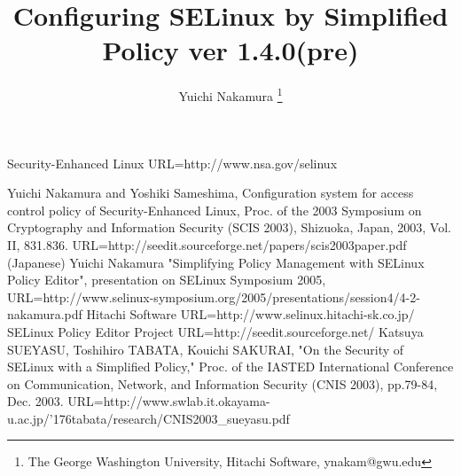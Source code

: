 \documentclass{article}
\title{Configuring SELinux by Simplified Policy ver 1.4.0(pre)}
\author{Yuichi Nakamura \thanks{The George Washington University, Hitachi Software, ynakam@gwu.edu}}
\begin{document}
\maketitle
\tableofcontents
\newpage







\begin{thebibliography}{99}
 Security-Enhanced Linux URL=http://www.nsa.gov/selinux

 Yuichi Nakamura and Yoshiki Sameshima,
	Configuration system 
for access control policy of Security-Enhanced Linux,
Proc. of the 2003 Symposium on Cryptography and
Information Security (SCIS 2003), Shizuoka, Japan,
2003, Vol. II,
	831.836.
	URL=http://seedit.sourceforge.net/papers/scis2003paper.pdf (Japanese)
 Yuichi Nakamura "Simplifying Policy Management
	with SELinux Policy Editor", presentation on SELinux Symposium
	2005,
	URL=http://www.selinux-symposium.org/2005/presentations/session4/4-2-nakamura.pdf
 Hitachi Software
	URL=http://www.selinux.hitachi-sk.co.jp/
 SELinux Policy Editor Project
	URL=http://seedit.sourceforge.net/
 Katsuya SUEYASU, Toshihiro TABATA, Kouichi SAKURAI,
"On the Security of SELinux with a Simplified Policy,"
Proc. of the IASTED International Conference on Communication, Network,
	and Information Security (CNIS 2003), pp.79-84,
	Dec. 2003. URL=http://www.swlab.it.okayama-u.ac.jp/{\char'176}tabata/research/CNIS2003\_sueyasu.pdf
\end{thebibliography}
\end{document}

